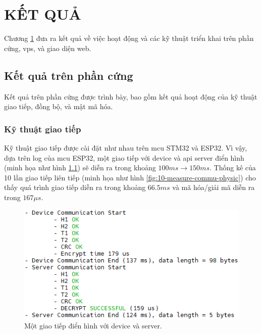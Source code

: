 \chapter{KẾT QUẢ}
\label{Chapter4}

Chương \ref{Chapter4} đưa ra kết quả về việc hoạt động và các kỹ thuật triển khai trên phần cứng, \acrshort{vps}, và giao diện web.

\section{Kết quả trên phần cứng}

Kết quả trên phần cứng được trình bày, bao gồm kết quả hoạt động của kỹ thuật giao tiếp, đồng bộ, và mật mã hóa.

\subsection{Kỹ thuật giao tiếp}

Kỹ thuật giao tiếp được cài đặt như nhau trên \acrshort{mcu} STM32 và ESP32. Vì vậy, dựa trên log của \acrshort{mcu} ESP32, một giao tiếp với device và \acrfull{api} server điển hình (minh họa như hình \ref{fig:communication-of-device-server}) sẽ diễn ra trong khoảng $100ms\rightarrow 150ms$. Thống kê của 10 lần giao tiếp liên tiếp (minh họa như hình \ref{fig:10-measure-commu-physic}) cho thấy quá trình giao tiếp diễn ra trong khoảng $66.5ms$ và mã hóa/giải mã diễn ra trong $167\mu s$.

\begin{figure}[htp]
\centering
\includegraphics[width=0.8\linewidth,frame]{images/fig-communication-of-device-server.png}
\caption{Một giao tiếp điển hình với device và server.}
\label{fig:communication-of-device-server}
\end{figure}

